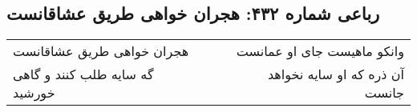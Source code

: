 \begin{center}
\section*{رباعی شماره ۴۳۲: هجران خواهی طریق عشاقانست}
\label{sec:0432}
\begin{longtable}{l p{0.5cm} r}
هجران خواهی طریق عشاقانست
&&
وانکو ماهیست جای او عمانست
\\
گه سایه طلب کنند و گاهی خورشید
&&
آن ذره که او سایه نخواهد جانست
\\
\end{longtable}
\end{center}

